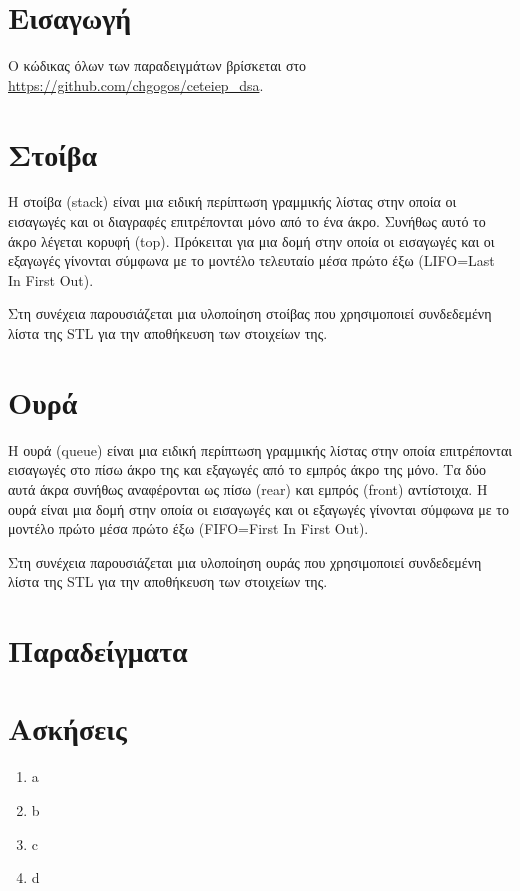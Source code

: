 \section{Εισαγωγή}
Ο κώδικας όλων των παραδειγμάτων βρίσκεται στο \href{https://github.com/chgogos/ceteiep_dsa}{https://github.com/chgogos/ceteiep\_dsa}.

\section{Στοίβα}
Η στοίβα (stack) είναι μια ειδική περίπτωση γραμμικής λίστας στην οποία οι εισαγωγές και οι διαγραφές επιτρέπονται μόνο από το ένα άκρο. Συνήθως αυτό το άκρο λέγεται κορυφή (top). Πρόκειται για μια δομή στην οποία οι εισαγωγές και οι εξαγωγές γίνονται σύμφωνα με το μοντέλο τελευταίο μέσα πρώτο έξω (LIFO=Last In First Out).

Στη συνέχεια παρουσιάζεται μια υλοποίηση στοίβας που χρησιμοποιεί συνδεδεμένη λίστα της STL για την αποθήκευση των στοιχείων της.

\section{Ουρά}
Η ουρά (queue) είναι μια ειδική περίπτωση γραμμικής λίστας στην οποία επιτρέπονται εισαγωγές στο πίσω άκρο της και εξαγωγές από το εμπρός άκρο της μόνο. Τα δύο αυτά άκρα συνήθως αναφέρονται ως
πίσω (rear) και εμπρός (front) αντίστοιχα. Η ουρά είναι μια δομή στην οποία οι εισαγωγές και οι εξαγωγές γίνονται σύμφωνα με το μοντέλο πρώτο μέσα πρώτο έξω (FIFO=First In First Out).

Στη συνέχεια παρουσιάζεται μια υλοποίηση ουράς που χρησιμοποιεί συνδεδεμένη λίστα της STL για την αποθήκευση των στοιχείων της.

\section{Παραδείγματα}

\section{Ασκήσεις}
\begin{enumerate}
\item a
\item b
\item c
\item d
\end{enumerate}

\begin{thebibliography}{9}

\end{thebibliography}

